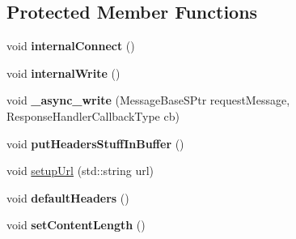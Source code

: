 \subsection*{Protected Member Functions}
\begin{DoxyCompactItemize}
\item 
\mbox{\label{class_client_a65270d4bec13972dc19c3eeab2b9c7a3}} 
void {\bfseries internal\+Connect} ()
\item 
\mbox{\label{class_client_ab9775fe0ef908d59a5ab17e27caa8fd8}} 
void {\bfseries internal\+Write} ()
\item 
\mbox{\label{class_client_ab58ce4f6c733f1ecf42e4aa4007f52b2}} 
void {\bfseries \+\_\+async\+\_\+write} (Message\+Base\+S\+Ptr request\+Message, Response\+Handler\+Callback\+Type cb)
\item 
\mbox{\label{class_client_a299af80ea0a0a71458a7ca4c91bc6ae7}} 
void {\bfseries put\+Headers\+Stuff\+In\+Buffer} ()
\item 
void \hyperlink{class_client_a6d0d6b3a672370c201a24c839c5f7382}{setup\+Url} (std\+::string url)
\item 
\mbox{\label{class_client_a2a4105d8c58e9c8e2ca1919baca31026}} 
void {\bfseries default\+Headers} ()
\item 
\mbox{\label{class_client_aedea5f9f1f9fb7a8732dc982a0e629c9}} 
void {\bfseries set\+Content\+Length} ()
\end{DoxyCompactItemize}
